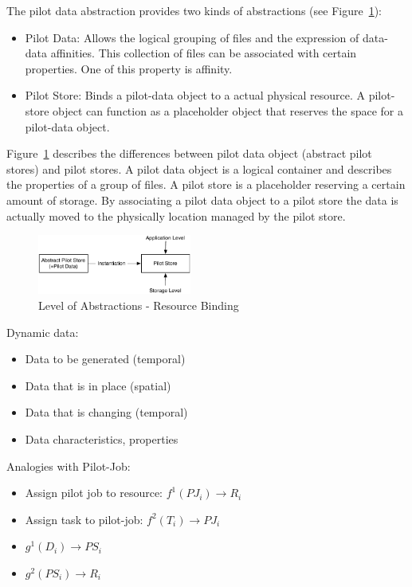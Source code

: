 \documentclass[conference,final]{IEEEtran}
\begin{document}
The pilot data abstraction provides two kinds of abstractions (see Figure~\ref{fig:figures_ps-instantiation}):
\begin{itemize}
    \item Pilot Data: Allows the logical grouping of files and the expression of data-data affinities. This collection of files can be associated with certain properties. One of this property is affinity.
    
    \item Pilot Store: Binds a pilot-data object to a actual physical resource. A pilot-store object can function as a placeholder object that reserves the space for a pilot-data object.
\end{itemize}


Figure~\ref{fig:figures_ps-instantiation} describes the differences between
pilot data object (abstract pilot stores) and pilot stores. A pilot data object
is a logical container and describes the properties of a group of files. A pilot
store is a placeholder reserving a certain amount of storage. By associating a
pilot data object to a pilot store the data is actually moved to the physically
location managed by the pilot store.

\begin{figure}[htbp]
    \centering
        \includegraphics[width=0.45\textwidth]{figures/ps-instantiation.pdf}
    \caption{Level of Abstractions - Resource Binding}
    \label{fig:figures_ps-instantiation}
\end{figure}



	
\noindent	
Dynamic data:
\begin{itemize}
	\item Data to be generated (temporal)
	\item Data that is in place (spatial)
	\item Data that is changing (temporal)
	\item Data characteristics, properties
\end{itemize}	

\noindent
Analogies with Pilot-Job:
\begin{itemize}
	\item Assign pilot job to resource: $f^{1}(PJ_i) \rightarrow R_i$
	\item Assign task to pilot-job: $f^{2}(T_i) \rightarrow PJ_i$ 

	\item $g^{1} (D_i) \rightarrow PS_i$
	\item $g^{2} (PS_i) \rightarrow R_i$
\end{itemize}
\end{document}

